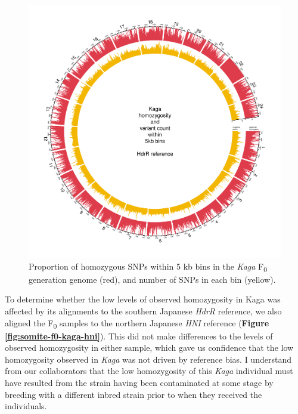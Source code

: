 \documentclass[
]{book}
\begin{document}
\begin{figure}
\includegraphics[width=1\linewidth]{figs/somites/Kaga} \caption{Proportion of homozygous SNPs within 5 kb bins in the \emph{Kaga} F\textsubscript{0} generation genome (red), and number of SNPs in each bin (yellow).}\label{fig:somite-f0-kaga}
\end{figure}

To determine whether the low levels of observed homozygosity in Kaga was affected by its alignments to the southern Japanese \emph{HdrR} reference, we also aligned the F\textsubscript{0} samples to the northern Japanese \emph{HNI} reference (\textbf{Figure \ref{fig:somite-f0-kaga-hni}}). This did not make differences to the levels of observed homozygosity in either sample, which gave us confidence that the low homozygosity observed in \emph{Kaga} was not driven by reference bias. I understand from our collaborators that the low homozygosity of this \emph{Kaga} individual must have resulted from the strain having been contaminated at some stage by breeding with a different inbred strain prior to when they received the individuals.
\end{document}
